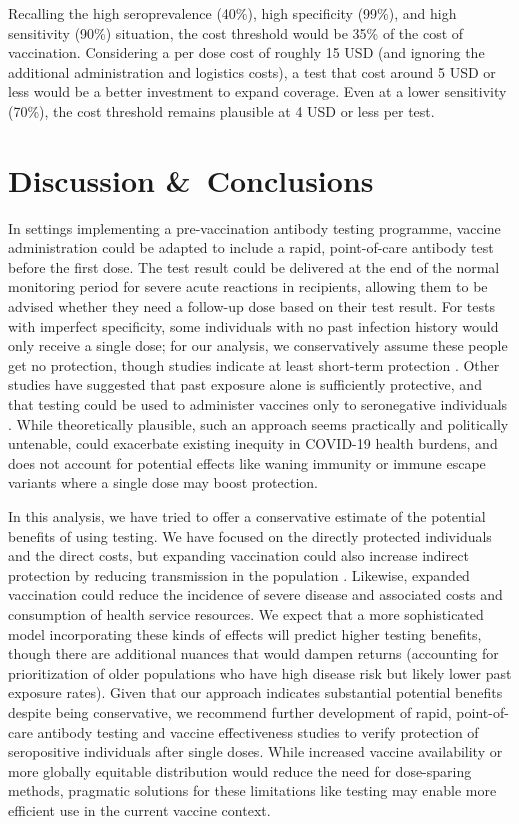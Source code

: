 \documentclass[10pt,a4paper,twocolumn]{article}
\begin{document}
Recalling the high seroprevalence (40\%), high specificity (99\%), and high sensitivity (90\%) situation, the cost threshold would be 35\% of the cost of vaccination. Considering a per dose cost of roughly 15 USD (and ignoring the additional administration and logistics costs), a test that cost around 5 USD or less would be a better investment to expand coverage. Even at a lower sensitivity (70\%), the cost threshold remains plausible at 4 USD or less per test.

\section*{Discussion \&\ Conclusions}

In settings implementing a pre-vaccination antibody testing programme, vaccine administration could be adapted to include a rapid, point-of-care antibody test before the first dose. The test result could be delivered at the end of the normal monitoring period for severe acute reactions in recipients, allowing them to be advised whether they need a follow-up dose based on their test result. For tests with imperfect specificity, some individuals with no past infection history would only receive a single dose; for our analysis, we conservatively assume these people get no protection, though studies indicate at least short-term protection \cite{krammer_antibody_2021}. Other studies have suggested that past exposure alone is sufficiently protective, and that testing could be used to administer vaccines only to seronegative individuals \cite{bubar_model-informed_2021}. While theoretically plausible, such an approach seems practically and politically untenable, could exacerbate existing inequity in COVID-19 health burdens, and does not account for potential effects like waning immunity or immune escape variants where a single dose may boost protection.

In this analysis, we have tried to offer a conservative estimate of the potential benefits of using testing. We have focused on the directly protected individuals and the direct costs, but expanding vaccination could also increase indirect protection by reducing transmission in the population \cite{regev-yochay_decreased_2021}. Likewise, expanded vaccination could reduce the incidence of severe disease and associated costs and consumption of health service resources. We expect that a more sophisticated model incorporating these kinds of effects will predict higher testing benefits, though there are additional nuances that would dampen returns (\eg* accounting for prioritization of older populations who have high disease risk but likely lower past exposure rates). Given that our approach indicates substantial potential benefits despite being conservative, we recommend further development of rapid, point-of-care antibody testing and vaccine effectiveness studies to verify protection of seropositive individuals after single doses. While increased vaccine availability or more globally equitable distribution would reduce the need for dose-sparing methods, pragmatic solutions for these limitations like testing may enable more efficient use in the current vaccine context.
\end{document}
